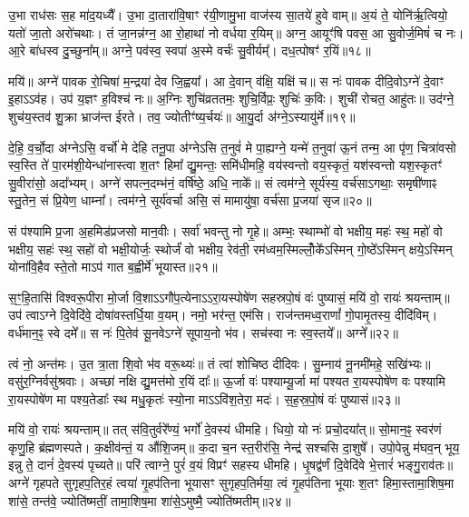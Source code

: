उ॒भा राध॑सः स॒ह मा॑द॒यध्यै᳚। उ॒भा दा॒तारा॑वि॒षाꣳ र॑यी॒णामु॒भा वाज॑स्य सा॒तये॑ हुवे वाम्॥ अ॒यं ते॒ योनि॑र्\mbox{}ऋ॒त्वियो॒ यतो॑ जा॒तो अरो॑चथाः। तं जा॒नन्न॑ग्न॒ आ रो॒हाथा॑ नो वर्धया र॒यिम्॥ अग्न॒ आयूꣳ॑षि पवस॒ आ सु॒वोर्ज॒मिषं॑ च नः। आ॒रे बा॑धस्व दु॒च्छुना᳚म्॥ अग्ने॒ पव॑स्व॒ स्वपा॑ अ॒स्मे वर्चः॑ सु॒वीर्यम्᳚। दध॒त्पोषꣳ॑ र॒यिं॥१८॥

मयि॑॥ अग्ने॑ पावक रो॒चिषा॑ म॒न्द्रया॑ देव जि॒ह्वया᳚। आ दे॒वान् व॑क्षि॒ यक्षि॑ च॥ स नः॑ पावक दीदि॒वो\-ऽग्ने॑ दे॒वाꣳ इ॒हा\-ऽ\-ऽव॑ह। उप॑ य॒ज्ञꣳ ह॒विश्च॑ नः॥ अ॒ग्निः शुचि॑व्रततमः॒ शुचि॒र्विप्रः॒ शुचिः॑ क॒विः। शुची॑ रोचत॒ आहु॑तः॥ उद॑ग्ने॒ शुच॑य॒स्तव॑ शु॒क्रा भ्राज॑न्त ईरते। तव॒ ज्योतीꣳ॑ष्य॒र्चयः॑॥ आ॒यु॒र्दा अ॑ग्ने॒\-ऽस्यायु॑र्मे॥१९॥

दे॒हि॒ व॒र्चो॒दा अ॑ग्ने\-ऽसि॒ वर्चो॑ मे देहि तनू॒पा अ॑ग्ने\-ऽसि त॒नुवं॑ मे पा॒ह्यग्ने॒ यन्मे॑ त॒नुवा॑ ऊ॒नं तन्म॒ आ पृ॑ण॒ चित्रा॑वसो स्व॒स्ति ते॑ पा॒रम॑शी॒येन्धा॑नास्त्वा श॒तꣳ हिमा᳚ द्यु॒मन्तः॒ समि॑धीमहि॒ वय॑स्वन्तो वय॒स्कृतं॒ यश॑स्वन्तो यश॒स्कृतꣳ॑ सु॒वीरा॑सो॒ अदा᳚भ्यम्। अग्ने॑ सपत्न॒दम्भ॑नं॒ वर्\mbox{}षि॑ष्ठे॒ अधि॒ नाके᳚॥ सं त्वम॑ग्ने॒ सूर्य॑स्य॒ वर्च॑सा\-ऽगथाः॒ समृषी॑णाꣴ स्तु॒तेन॒ सं प्रि॒येण॒ धाम्ना᳚। त्वम॑ग्ने॒ सूर्य॑वर्चा असि॒ सं मामायु॑षा॒ वर्च॑सा प्र॒जया॑ सृज॥२०॥

{\anuvakamend[{आ॒हु॒वध्यै॑ र॒यिं मे॒ वर्च॑सा स॒प्तद॑श च॥५॥}]}

सं प॑श्यामि प्र॒जा अ॒हमिड॑प्रजसो मान॒वीः। सर्वा॑ भवन्तु नो गृ॒हे॥ अम्भः॒ स्थाम्भो॑ वो भक्षीय॒ महः॑ स्थ॒ महो॑ वो भक्षीय॒ सहः॑ स्थ॒ सहो॑ वो भक्षी॒योर्जः॒ स्थोर्जं॑ वो भक्षीय॒ रेव॑ती॒ रम॑ध्वम॒स्मिल्लोँ॒के᳚\-ऽस्मिन् गो॒ष्ठे᳚\-ऽस्मिन् क्षये॒\-ऽस्मिन् योना॑वि॒हैव स्ते॒तो मा\-ऽप॑ गात ब॒ह्वीर्मे॑ भूयास्त॥२१॥

स॒ꣳ॒हि॒तासि॑ विश्वरू॒पीरा मो॒र्जा वि॒शा\-ऽ\-ऽगौ॑प॒त्येना\-ऽ\-ऽरा॒यस्पोषे॑ण सहस्रपो॒षं वः॑ पुष्यासं॒ मयि॑ वो॒ रायः॑ श्रयन्ताम्॥ उप॑ त्वा\-ऽग्ने दि॒वेदि॑वे॒ दोषा॑वस्तर्धि॒या व॒यम्। नमो॒ भर॑न्त॒ एम॑सि। राज॑न्तमध्व॒राणां᳚ गो॒पामृ॒तस्य॒ दीदि॑विम्। वर्ध॑मान॒ꣴ॒ स्वे दमे᳚॥ स नः॑ पि॒तेव॑ सू॒नवे\-ऽग्ने॑ सूपाय॒नो भ॑व। सच॑स्वा नः स्व॒स्तये᳚॥ अग्ने᳚॥२२॥

त्वं नो॒ अन्त॑मः। उ॒त त्रा॒ता शि॒वो भ॑व वरू॒थ्यः॑॥ तं त्वा॑ शोचिष्ठ दीदिवः। सु॒म्नाय॑ नू॒नमी॑महे॒ सखि॑भ्यः॥ वसु॑र॒ग्निर्वसु॑श्रवाः। अच्छा॑ नक्षि द्यु॒मत्त॑मो र॒यिं दाः᳚॥ ऊ॒र्जा वः॑ पश्याम्यू॒र्जा मा॑ पश्यत रा॒यस्पोषे॑ण वः पश्यामि रा॒यस्पोषे॑ण मा पश्य॒तेडाः᳚ स्थ मधु॒कृतः॑ स्यो॒ना मा\-ऽ\-ऽवि॑श॒तेरा॒ मदः॑। स॒ह॒स्र॒पो॒षं वः॑ पुष्यासं॥२३॥

मयि॑ वो॒ रायः॑ श्रयन्ताम्॥ तत् स॑वि॒तुर्वरे᳚ण्यं॒ भर्गो॑ दे॒वस्य॑ धीमहि। धियो॒ यो नः॑ प्रचो॒दया᳚त्॥ सो॒मान॒ꣴ॒ स्वर॑णं कृणु॒हि ब्र॑ह्मणस्पते। क॒क्षीव॑न्तं॒ य औ॑शि॒जम्॥ क॒दा च॒न स्त॒रीर॑सि॒ नेन्द्र॑ सश्चसि दा॒शुषे᳚। उपो॒पेन्नु म॑घव॒न् भूय॒ इन्नु ते॒ दानं॑ दे॒वस्य॑ पृच्यते॥ परि॑ त्वाग्ने॒ पुरं॑ व॒यं विप्रꣳ॑ सहस्य धीमहि। धृ॒षद्व॑र्णं दि॒वेदि॑वे भे॒त्तारं॑ भङ्गु॒राव॑तः॥ अग्ने॑ गृहपते सुगृहप॒तिर॒हं त्वया॑ गृ॒हप॑तिना भूयासꣳ सुगृहप॒तिर्मया॒ त्वं गृ॒हप॑तिना भूयाः श॒तꣳ हिमा॒स्तामा॒शिष॒मा शा॑से॒ तन्त॑वे॒ ज्योति॑ष्मतीं॒ तामा॒शिष॒मा शा॑से॒\-ऽमुष्मै॒ ज्योति॑ष्मतीम्॥२४॥

